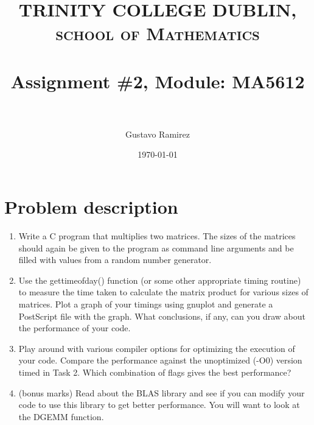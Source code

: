 \documentclass[paper=a4, fontsize=11pt]{scrartcl} %
\title{	
\normalfont \normalsize 
\textsc{TRINITY COLLEGE DUBLIN, school of Mathematics} \\ [25pt] %
\horrule{0.5pt} \\[0.4cm] %
\huge Assignment \#2, Module: MA5612 \\ %
\horrule{2pt} \\[0.5cm] %
}
\author{Gustavo Ramirez} %
\date{\normalsize\today} %
\numberwithin{equation}{section} %
\numberwithin{figure}{section} %
\numberwithin{table}{section} %
\begin{document}
\maketitle %


\section{Problem description}


\begin{enumerate}
\item Write a C program that multiplies two matrices. The sizes of the matrices should again be given to the program as command line arguments and be filled with values from a random number generator.
\item Use the gettimeofday() function (or some other appropriate timing routine) to measure the time taken to calculate the matrix product for various sizes of matrices. Plot a graph of your timings using gnuplot and generate a PostScript file with the graph. What conclusions, if any, can you draw about the performance of your code.
\item Play around with various compiler options for optimizing the execution of your code. Compare the performance against the unoptimized (-O0) version timed in Task 2. Which combination of flags gives the best performance?
\item (bonus marks) Read about the BLAS library and see if you can modify your code to use this library to get better performance. You will want to look at the DGEMM function.
\end{enumerate}

\newpage


\begin{comment}

USEFUL LINKS:

official sources for terminology:
-----
http://www.intel.com/content/www/us/en/support/topics/glossary.html
https://www-01.ibm.com/software/globalization/terminology/a.html
-----




about IMB processors:
-----

insert in google: list of ibm processors
https://en.wikipedia.org/wiki/List_of_IBM_products
https://www-01.ibm.com/software/passportadvantage/guide_to_identifying_processor_family.html
http://www.nextplatform.com/2015/08/10/ibm-roadmap-extends-power-chips-to-2020-and-beyond/
http://www.theverge.com/2015/7/9/8919091/ibm-7nm-transistor-processor
https://www.ibm.com/developerworks/ibmi/library/i-ibmi-7_2-and-ibm-power8/
-----




\end{comment}
\end{document}
